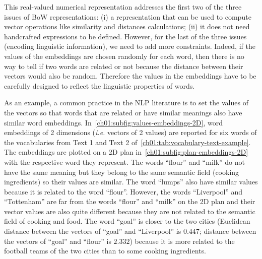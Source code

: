   This real-valued numerical representation addresses the first two of the three
  issues of BoW representations: (i) a representation that can be used to
  compute vector operations like similarity and distances calculations; (ii) it
  does not need handcrafted expressions to be defined. However, for the last of
  the three issues (encoding linguistic information), we need to add more
  constraints. Indeed, if the values of the embeddings are chosen randomly for
  each word, then there is no way to tell if two words are related or not
  because the distance between their vectors would also be random. Therefore the
  values in the embeddings have to be carefully designed to reflect the
  linguistic properties of words.\medskip

  As an example, a common practice in the NLP literature
  \citep{mikolov2013efficient, pennington2014glove} is to set the values of the
  vectors so that words that are related or have similar meanings also have
  similar word embeddings. In~\autoref{ch01:subfig:values-embeddings-2D}, word
  embeddings of 2 dimensions (\textit{i.e.} vectors of 2 values) are reported
  for six words of the vocabularies from Text 1 and Text 2
  of~\autoref{ch01:tab:vocabulary-text-example}. The embeddings are plotted on a
  2D plan in~\autoref{ch01:subfig:plan-embeddings-2D} with the respective word
  they represent. The words ``flour'' and ``milk'' do not have the same meaning
  but they belong to the same semantic field (cooking ingredients) so their
  values are similar. The word ``lumps'' also have similar values because it is
  related to the word ``flour''. However, the words ``Liverpool'' and
  ``Tottenham'' are far from the words ``flour'' and ``milk'' on the 2D plan and
  their vector values are also quite different because they are not related to
  the semantic field of cooking and food. The word ``goal'' is closer to the two
  cities (Euclidean distance between the vectors of ``goal'' and ``Liverpool''
  is $0.447$; distance between the vectors of ``goal'' and ``flour'' is $2.332$)
  because it is more related to the football teams of the two cities than to
  some cooking ingredients.\medskip

